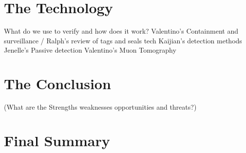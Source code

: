 \documentclass[a4paper]{report}
\begin{document}
\section{The Technology}
	What do we use to verify and how does it work?
Valentino’s Containment and surveillance / Ralph’s review of tags and seals tech
Kaijian’s detection methods
Jenelle’s Passive detection
Valentino’s Muon Tomography 
\section{The Conclusion}
	(What are the Strengths weaknesses opportunities and threats?)
\section{Final Summary}
\end{document}
